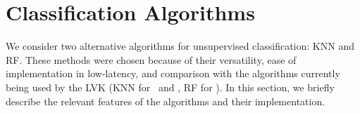 \section{Classification Algorithms} \label{algos}

We consider two alternative algorithms for unsupervised classification: \ac{KNN} and \ac{RF}. These methods were chosen because of their versatility, ease of implementation in low-latency, and comparison with the algorithms currently being used by the \ac{LVK} (\ac{KNN} for \hasns\ and \hasrem, \ac{RF} for \hasgap).
In this section, we briefly describe the relevant features of the algorithms and their implementation. 




